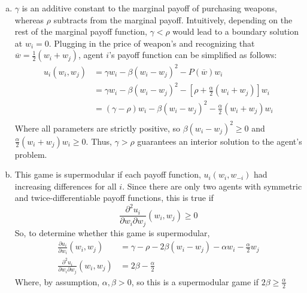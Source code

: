 \documentclass{article}
\begin{document}
\begin{enumerate}[(a)]
	\item $\gamma$ is an additive constant to the marginal payoff of purchasing weapons, whereas $\rho$ subtracts from the marginal payoff. Intuitively, depending on the rest of the marginal payoff function, ${\gamma<\rho}$ would lead to a boundary solution at $w_i=0$. Plugging in the price of weapon's and recognizing that ${\overline{w}=\frac{1}{2}(w_i + w_j)}$, agent $i$'s payoff function can be simplified as follows:
		\begin{align*}
			u_i(w_i,w_j) 	&= \gamma w_i - \beta(w_i-w_j)^2-P(\overline{w})w_i	\\
							&= \gamma w_i - \beta(w_i-w_j)^2-\left[\rho+\frac{\alpha}{2}(w_i + w_j)\right]w_i	\\
							&= (\gamma-\rho)w_i-\beta(w_i-w_j)^2 - \frac{\alpha}{2}(w_i+w_j) w_i	\\
		\end{align*}
		Where all parameters are strictly positive, so ${\beta(w_i-w_j)^2\geq0}$ and ${\frac{\alpha}{2}(w_i+w_j) w_i\geq0}$. Thus, $\gamma>\rho$ guarantees an interior solution to the agent's problem.
	
	\item This game is supermodular if each payoff function, $u_i(w_i,w_{-i})$ had increasing differences for all $i$. Since there are only two agents with symmetric and twice-differentiable payoff functions, this is true if
		\[
			\frac{\partial^2 u_i}{\partial w_i \partial w_j}(w_i,w_j) \geq 0
		\]
		So, to determine whether this game is supermodular,
		\begin{align*}
			\frac{\partial u_i}{\partial w_i}(w_i,w_j) &= \gamma-\rho-2\beta(w_i-w_j)-\alpha w_i - \frac{\alpha}{2}w_j	\\
			\frac{\partial^2 u_i}{\partial w_i \partial w_j}(w_i,w_j)  &= 2\beta - \frac{\alpha}{2}
		\end{align*}
		Where, by assumption, $\alpha,\beta >0$, so this is a supermodular game if ${2\beta \geq \frac{\alpha}{2}}$
	

\end{enumerate}
\end{document}
